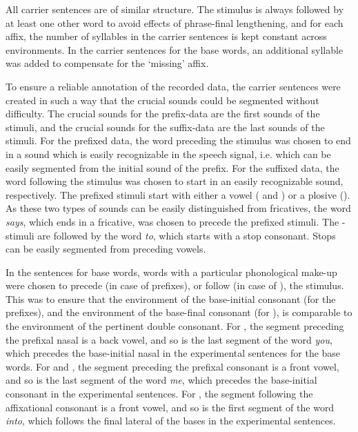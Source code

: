   

All carrier sentences are of similar structure. 
The stimulus is always followed by at least one other word to avoid effects of phrase-final lengthening, and for each affix, the number of syllables in the carrier sentences is kept constant across environments. 
In the carrier sentences for the base words, an additional syllable was added to compensate for the `missing' affix. 


To ensure a reliable annotation of the recorded data, the carrier sentences were created in such a way that the crucial sounds could be segmented without difficulty. The crucial sounds for the prefix-data are the first sounds of the stimuli, and the crucial sounds for the suffix-data are the last sounds of the stimuli. 
For the prefixed data, the word preceding the stimulus was chosen to end in a sound which is easily recognizable in the speech signal, i.e. which can be easily segmented from the initial sound of the prefix. For the suffixed data, the word following the stimulus was chosen to start in an easily recognizable sound, respectively. 
The prefixed stimuli start with either a vowel ( and ) or a plosive (). As these two types of sounds can be easily distinguished from fricatives,   the word \textit{says}, which ends in a fricative, was chosen to precede the prefixed stimuli. 
The -stimuli are followed by the word \textit{to}, which starts with a stop consonant. Stops can be easily segmented from preceding vowels.  


In the sentences for base words, words with a particular phonological make-up were chosen to precede (in case of prefixes), or follow (in case of ), the stimulus. This was to ensure that the environment of the base-initial consonant (for the prefixes), and the environment of the base-final consonant (for ), is comparable to the environment of the pertinent double consonant.
For , the segment preceding the prefixal nasal is a back vowel, and so is the last segment of the word \textit{you}, which precedes the base-initial nasal in the experimental sentences for the base words. 
For  and , the segment preceding the prefixal consonant is a front vowel, and so is the last segment of the word \textit{me}, which precedes the base-initial consonant in the experimental sentences. 
For , the segment following the affixational consonant is a front vowel, and so is the first segment of the word \textit{into}, which follows the final lateral of the bases in the experimental sentences. 



